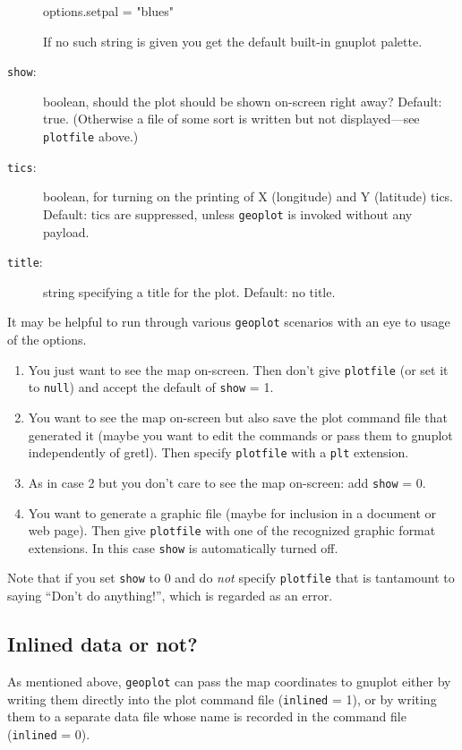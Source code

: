 \documentclass{article}
\begin{document}
\begin{description}
\begin{code}
    options.setpal = "blues"
  \end{code}
  If no such string is given you get the default built-in
  \textsf{gnuplot} palette.
\item[\texttt{show}:] boolean, should the plot should be shown
  on-screen right away? Default: true. (Otherwise a file of some sort
  is written but not displayed---see \texttt{plotfile} above.)
\item[\texttt{tics}:] boolean, for turning on the printing of X
  (longitude) and Y (latitude) tics. Default: tics are suppressed,
  unless \texttt{geoplot} is invoked without any payload.
\item[\texttt{title}:] string specifying a title for the
  plot. Default: no title.
\end{description}

It may be helpful to run through various \texttt{geoplot} scenarios
with an eye to usage of the options.

\begin{enumerate}
\item You just want to see the map on-screen. Then don't give
  \texttt{plotfile} (or set it to \texttt{null}) and accept the
  default of \texttt{show} = 1.\label{just-see}
\item You want to see the map on-screen but also save the plot command
  file that generated it (maybe you want to edit the commands or pass
  them to \textsf{gnuplot} independently of gretl). Then specify
  \texttt{plotfile} with a \texttt{plt} extension.\label{see-and-save}
\item As in case 2 but you don't care to see the map on-screen: add
  \texttt{show} = 0.
\item You want to generate a graphic file (maybe for inclusion in a
  document or web page). Then give \texttt{plotfile} with one of the
  recognized graphic format extensions. In this case \texttt{show} is
  automatically turned off.
\end{enumerate}

Note that if you set \texttt{show} to 0 and do \textit{not} specify
\texttt{plotfile} that is tantamount to saying ``Don't do anything!'',
which is regarded as an error.

\subsection{Inlined data or not?}

As mentioned above, \texttt{geoplot} can pass the map coordinates to
\textsf{gnuplot} either by writing them directly into the plot command
file (\texttt{inlined} = 1), or by writing them to a separate data
file whose name is recorded in the command file (\texttt{inlined} =
0).
\end{document}
